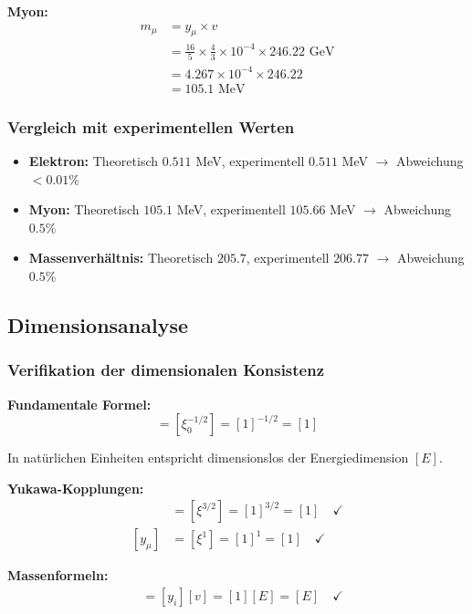 \documentclass[12pt,a4paper]{article}
\begin{document}
\textbf{Myon:}
\begin{align}
	m_\mu &= y_\mu \times v\\
	&= \frac{16}{5} \times \frac{4}{3} \times 10^{-4} \times 246.22 \text{ GeV}\\
	&= 4.267 \times 10^{-4} \times 246.22\\
	&= 105.1 \text{ MeV}
\end{align}

\subsubsection{Vergleich mit experimentellen Werten}

\begin{itemize}
	\item \textbf{Elektron:} Theoretisch $0.511$ MeV, experimentell $0.511$ MeV $\rightarrow$ Abweichung $< 0.01\%$
	\item \textbf{Myon:} Theoretisch $105.1$ MeV, experimentell $105.66$ MeV $\rightarrow$ Abweichung $0.5\%$
	\item \textbf{Massenverhältnis:} Theoretisch $205.7$, experimentell $206.77$ $\rightarrow$ Abweichung $0.5\%$
\end{itemize}

\subsection{Dimensionsanalyse}

\subsubsection{Verifikation der dimensionalen Konsistenz}

\textbf{Fundamentale Formel:}
\begin{equation}
	[v] = [\xi_0^{-1/2}] = [1]^{-1/2} = [1]
\end{equation}

In natürlichen Einheiten entspricht dimensionslos der Energiedimension $[E]$.

\textbf{Yukawa-Kopplungen:}
\begin{align}
	[y_e] &= [\xi^{3/2}] = [1]^{3/2} = [1] \quad \checkmark\\
	[y_\mu] &= [\xi^1] = [1]^1 = [1] \quad \checkmark
\end{align}

\textbf{Massenformeln:}
\begin{align}
	[m_i] &= [y_i][v] = [1][E] = [E] \quad \checkmark
\end{align}
\end{document}
